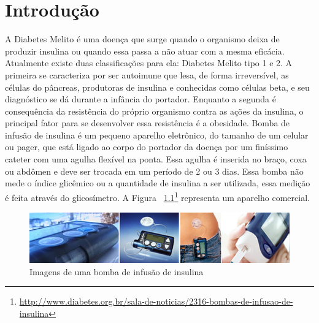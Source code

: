 \chapter{Introdução}
A Diabetes Melito é uma doença que surge quando o organismo deixa de produzir insulina ou quando essa passa a não atuar com a mesma eficácia. Atualmente existe duas classificações para ela: Diabetes Melito tipo 1 e 2. A primeira se caracteriza por ser autoimune que lesa, de forma irreversível, as células do pâncreas, produtoras de insulina e conhecidas como células beta, e seu diagnóstico se dá durante a infância do portador. Enquanto a segunda é consequência da resistência do próprio organismo contra as ações da insulina, o principal fator para se desenvolver essa resistência é a obesidade\cite{portaldiabetes2008}.
Bomba de infusão de insulina é um pequeno aparelho eletrônico, do tamanho de um celular ou pager, que está ligado ao corpo do portador da doença por um finíssimo cateter com uma agulha flexível na ponta. Essa agulha é inserida no braço, coxa ou abdômen e deve ser trocada em um período de 2 ou 3 dias. Essa bomba não mede o índice glicêmico ou a quantidade de insulina a ser utilizada, essa medição é feita através do glicosímetro. A Figura ~\ref{fig:bombainfusao}\footnote{\url{http://www.diabetes.org.br/sala-de-noticias/2316-bombas-de-infusao-de-insulina}} representa um aparelho comercial.

\begin{figure}[htp]
	\centering
	\includegraphics[scale=1]{images/bombainsulina.png}
	\caption{Imagens de uma bomba de infusão de insulina}	
	\label{fig:bombainfusao}	
\end{figure}


